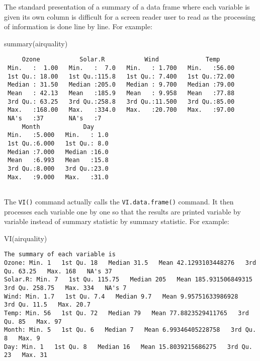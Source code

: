 \documentclass[
]{book}
\newenvironment{Shaded}{\begin{snugshade}}{\end{snugshade}}
\newcommand{\FunctionTok}[1]{\textcolor[rgb]{0.00,0.00,0.00}{#1}}
\newcommand{\NormalTok}[1]{#1}
\begin{document}
The standard presentation of a summary of a data frame where each variable is given its own column is difficult for a screen reader user to read as the processing of information is done line by line. For example:

\begin{Shaded}
\begin{Highlighting}[]
\FunctionTok{summary}\NormalTok{(airquality)}
\end{Highlighting}
\end{Shaded}

\begin{verbatim}
     Ozone           Solar.R           Wind             Temp      
 Min.   :  1.00   Min.   :  7.0   Min.   : 1.700   Min.   :56.00  
 1st Qu.: 18.00   1st Qu.:115.8   1st Qu.: 7.400   1st Qu.:72.00  
 Median : 31.50   Median :205.0   Median : 9.700   Median :79.00  
 Mean   : 42.13   Mean   :185.9   Mean   : 9.958   Mean   :77.88  
 3rd Qu.: 63.25   3rd Qu.:258.8   3rd Qu.:11.500   3rd Qu.:85.00  
 Max.   :168.00   Max.   :334.0   Max.   :20.700   Max.   :97.00  
 NA's   :37       NA's   :7                                       
     Month            Day      
 Min.   :5.000   Min.   : 1.0  
 1st Qu.:6.000   1st Qu.: 8.0  
 Median :7.000   Median :16.0  
 Mean   :6.993   Mean   :15.8  
 3rd Qu.:8.000   3rd Qu.:23.0  
 Max.   :9.000   Max.   :31.0  
                               
\end{verbatim}

The \texttt{VI()} command actually calls the \texttt{VI.data.frame()} command. It then processes each variable one by one so that the results are printed variable by variable instead of summary statistic by summary statistic. For example:

\begin{Shaded}
\begin{Highlighting}[]
\FunctionTok{VI}\NormalTok{(airquality)}
\end{Highlighting}
\end{Shaded}

\begin{verbatim}
The summary of each variable is
Ozone: Min. 1   1st Qu. 18   Median 31.5   Mean 42.1293103448276   3rd Qu. 63.25   Max. 168   NA's 37  
Solar.R: Min. 7   1st Qu. 115.75   Median 205   Mean 185.931506849315   3rd Qu. 258.75   Max. 334   NA's 7  
Wind: Min. 1.7   1st Qu. 7.4   Median 9.7   Mean 9.95751633986928   3rd Qu. 11.5   Max. 20.7  
Temp: Min. 56   1st Qu. 72   Median 79   Mean 77.8823529411765   3rd Qu. 85   Max. 97  
Month: Min. 5   1st Qu. 6   Median 7   Mean 6.99346405228758   3rd Qu. 8   Max. 9  
Day: Min. 1   1st Qu. 8   Median 16   Mean 15.8039215686275   3rd Qu. 23   Max. 31  
\end{verbatim}
\end{document}
